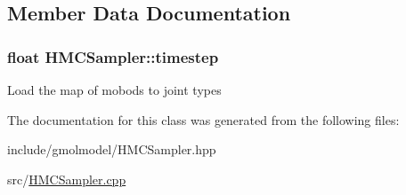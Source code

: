 \subsection{Member Data Documentation}
\subsubsection[{\texorpdfstring{timestep}{timestep}}]{\setlength{\rightskip}{0pt plus 5cm}float H\+M\+C\+Sampler\+::timestep\hspace{0.3cm}{\ttfamily [protected]}}\hypertarget{classHMCSampler_a8cd8b25b42e94acb34aa0dea64c67b5b}{}\label{classHMCSampler_a8cd8b25b42e94acb34aa0dea64c67b5b}
Load the map of mobods to joint types 

The documentation for this class was generated from the following files\+:\begin{DoxyCompactItemize}
\item 
include/gmolmodel/H\+M\+C\+Sampler.\+hpp\item 
src/\hyperlink{HMCSampler_8cpp}{H\+M\+C\+Sampler.\+cpp}\end{DoxyCompactItemize}
